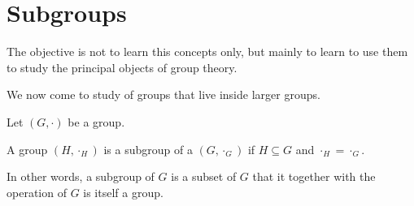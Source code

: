 \documentclass[11pt,a4paper]{article}
\begin{document}
\section{Subgroups}


The objective is not to learn this concepts only, but mainly to learn to use them to study the principal objects of group theory.

We now come to study of groups that live inside larger groups.

Let \((G,\cdot)\) be a group.

\begin{defi}
    A group \((H,\cdot_H)\) is a subgroup of a  \((G,\cdot_G)\) if \(H\subseteq G\) and \(\cdot_H = \cdot_G\).
\end{defi}

In other words, a subgroup of \(G\) is a subset of \(G\) that it together with the operation of \(G\) is itself a group.
\end{document}
